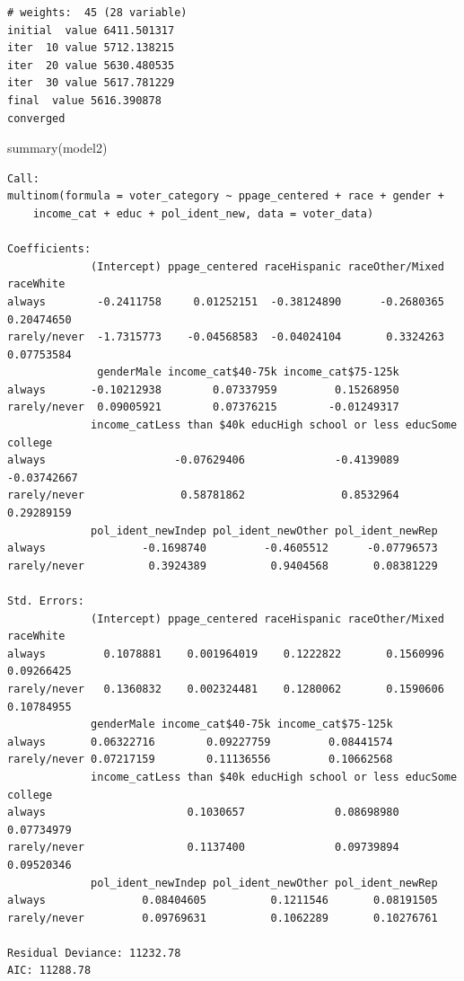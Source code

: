 \documentclass[
  letterpaper,
  DIV=11,
  numbers=noendperiod]{scrartcl}
\newenvironment{Shaded}{\begin{snugshade}}{\end{snugshade}}
\newcommand{\FunctionTok}[1]{\textcolor[rgb]{0.28,0.35,0.67}{#1}}
\newcommand{\NormalTok}[1]{\textcolor[rgb]{0.00,0.23,0.31}{#1}}
\begin{document}
\begin{verbatim}
# weights:  45 (28 variable)
initial  value 6411.501317 
iter  10 value 5712.138215
iter  20 value 5630.480535
iter  30 value 5617.781229
final  value 5616.390878 
converged
\end{verbatim}

\begin{Shaded}
\begin{Highlighting}[]
\FunctionTok{summary}\NormalTok{(model2)}
\end{Highlighting}
\end{Shaded}

\begin{verbatim}
Call:
multinom(formula = voter_category ~ ppage_centered + race + gender + 
    income_cat + educ + pol_ident_new, data = voter_data)

Coefficients:
             (Intercept) ppage_centered raceHispanic raceOther/Mixed  raceWhite
always        -0.2411758     0.01252151  -0.38124890      -0.2680365 0.20474650
rarely/never  -1.7315773    -0.04568583  -0.04024104       0.3324263 0.07753584
              genderMale income_cat$40-75k income_cat$75-125k
always       -0.10212938        0.07337959         0.15268950
rarely/never  0.09005921        0.07376215        -0.01249317
             income_catLess than $40k educHigh school or less educSome college
always                    -0.07629406              -0.4139089      -0.03742667
rarely/never               0.58781862               0.8532964       0.29289159
             pol_ident_newIndep pol_ident_newOther pol_ident_newRep
always               -0.1698740         -0.4605512      -0.07796573
rarely/never          0.3924389          0.9404568       0.08381229

Std. Errors:
             (Intercept) ppage_centered raceHispanic raceOther/Mixed  raceWhite
always         0.1078881    0.001964019    0.1222822       0.1560996 0.09266425
rarely/never   0.1360832    0.002324481    0.1280062       0.1590606 0.10784955
             genderMale income_cat$40-75k income_cat$75-125k
always       0.06322716        0.09227759         0.08441574
rarely/never 0.07217159        0.11136556         0.10662568
             income_catLess than $40k educHigh school or less educSome college
always                      0.1030657              0.08698980       0.07734979
rarely/never                0.1137400              0.09739894       0.09520346
             pol_ident_newIndep pol_ident_newOther pol_ident_newRep
always               0.08404605          0.1211546       0.08191505
rarely/never         0.09769631          0.1062289       0.10276761

Residual Deviance: 11232.78 
AIC: 11288.78 
\end{verbatim}
\end{document}
